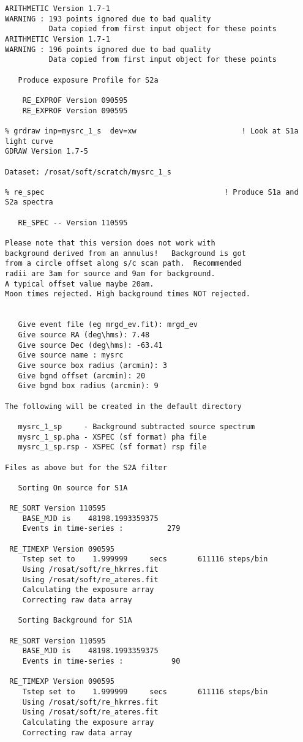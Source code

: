 \begin{small}
\begin{verbatim}
ARITHMETIC Version 1.7-1
WARNING : 193 points ignored due to bad quality
          Data copied from first input object for these points
ARITHMETIC Version 1.7-1
WARNING : 196 points ignored due to bad quality
          Data copied from first input object for these points

   Produce exposure Profile for S2a

    RE_EXPROF Version 090595
    RE_EXPROF Version 090595

% grdraw inp=mysrc_1_s  dev=xw                        ! Look at S1a light curve
GDRAW Version 1.7-5

Dataset: /rosat/soft/scratch/mysrc_1_s

% re_spec                                         ! Produce S1a and S2a spectra

   RE_SPEC -- Version 110595

Please note that this version does not work with
background derived from an annulus!   Background is got
from a circle offset along s/c scan path.  Recommended
radii are 3am for source and 9am for background.
A typical offset value maybe 20am.
Moon times rejected. High background times NOT rejected.


   Give event file (eg mrgd_ev.fit): mrgd_ev
   Give source RA (deg\hms): 7.48
   Give source Dec (deg\hms): -63.41
   Give source name : mysrc
   Give source box radius (arcmin): 3
   Give bgnd offset (arcmin): 20
   Give bgnd box radius (arcmin): 9

The following will be created in the default directory

   mysrc_1_sp     - Background subtracted source spectrum
   mysrc_1_sp.pha - XSPEC (sf format) pha file
   mysrc_1_sp.rsp - XSPEC (sf format) rsp file

Files as above but for the S2A filter

   Sorting On source for S1A

 RE_SORT Version 110595
    BASE_MJD is    48198.1993359375
    Events in time-series :          279

 RE_TIMEXP Version 090595
    Tstep set to    1.999999     secs       611116 steps/bin
    Using /rosat/soft/re_hkrres.fit
    Using /rosat/soft/re_ateres.fit
    Calculating the exposure array
    Correcting raw data array

   Sorting Background for S1A

 RE_SORT Version 110595
    BASE_MJD is    48198.1993359375
    Events in time-series :           90

 RE_TIMEXP Version 090595
    Tstep set to    1.999999     secs       611116 steps/bin
    Using /rosat/soft/re_hkrres.fit
    Using /rosat/soft/re_ateres.fit
    Calculating the exposure array
    Correcting raw data array


\end{verbatim}
\end{small}
